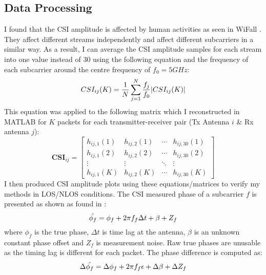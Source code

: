 \subsection{Data Processing}
I found that the CSI amplitude is affected by human activities as seen in WiFall \citep{WiFall}. They affect different streams independently and affect different subcarriers in a similar way. As a result, I can average the CSI amplitude samples for each stream into one value instead of 30 using the following equation and the frequency of each subcarrier around the centre frequency of $f_0 = 5GHz$:
\vspace{-11pt}
\begin{equation}\label{eqn:3.1}
    CSI_{ij}(K) = \frac{1}{N} \sum_{j=1}^{N} \frac{f_j}{f_0} |CSI_{ij}(K)|
    \vspace{-11pt}
\end{equation}
This equation was applied to the following matrix which I reconstructed in MATLAB for $K$ packets for each transmitter-receiver pair (Tx Antenna $i$ \& Rx antenna $j$):
\vspace{-33pt}
\begin{equation}\label{eqn:3.2}
\textbf{CSI}_{ij}=\left[
\begin{array}{cccc}
    h_{ij,1}(1) & h_{ij,2}(1) & \cdots & h_{ij,30}(1) \\
    h_{ij,1}(2) & h_{ij,2}(2) & \cdots & h_{ij,30}(2) \\
   \vdots & \vdots & \ddots & \vdots \\
    h_{ij,1}(K) & h_{ij,2}(K) & \cdots & h_{ij,30}(K) 
\end{array}
\right]
\end{equation}
I then produced CSI amplitude plots using these equations/matrices to verify my methods in LOS/NLOS conditions. The CSI measured phase of a subcarrier $f$ is presented as shown as found in \cite{MonaLisaSpotFi}:
\vspace{-11pt}
\begin{equation}\label{eqn:3.3}
    \hat{\phi_f} = \phi_{f}+2\pi f_{f}\Delta t + \beta + Z_f
    \vspace{-11pt}
\end{equation}
where $\phi_{f}$ is the true phase, $\Delta t$ is time lag at the antenna, $\beta$ is an unknown constant phase offset and $Z_f$ is measurement noise. Raw true phases are unusable as the timing lag is different for each packet. The phase difference is computed as:
\vspace{-11pt}
\begin{equation}\label{eqn:3.4}
    \Delta\hat{\phi_f} = \Delta\phi_{f}+2\pi f_{f}\epsilon  + \Delta\beta + \Delta Z_f
    \vspace{-11pt}
\end{equation}
